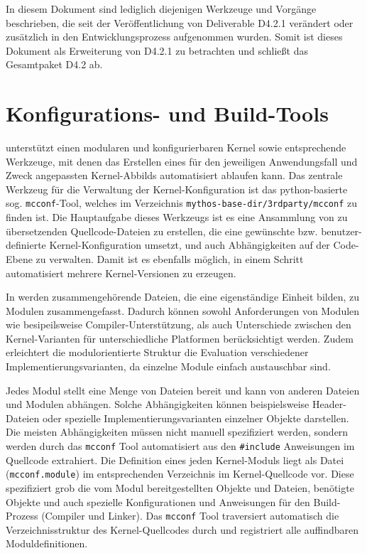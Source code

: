 In diesem Dokument sind lediglich diejenigen Werkzeuge und Vorgänge beschrieben,
die seit der Veröffentlichung von Deliverable D4.2.1 verändert oder zusätzlich in den
Entwicklungsprozess aufgenommen wurden. Somit ist dieses Dokument als
Erweiterung von D4.2.1 zu betrachten und schließt das Gesamtpaket D4.2 ab.

\section{Konfigurations- und Build-Tools}

\mythos unterstützt einen modularen und konfigurierbaren Kernel sowie
entsprechende Werkzeuge, mit denen das Erstellen eines für den jeweiligen
Anwendungsfall und Zweck angepassten Kernel-Abbilds automatisiert ablaufen kann.
Das zentrale Werkzeug für die Verwaltung der Kernel-Konfiguration ist das
python-basierte sog. \texttt{mcconf}-Tool, welches im Verzeichnis
\texttt{{mythos-base-dir}/3rdparty/mcconf} zu finden ist. Die Hauptaufgabe
dieses Werkzeugs ist es eine Ansammlung von zu übersetzenden Quellcode-Dateien
zu erstellen, die eine gewünschte bzw. benutzer-definierte Kernel-Konfiguration
umsetzt, und auch Abhängigkeiten auf der Code-Ebene zu verwalten. Damit ist
es ebenfalls möglich, in einem Schritt automatisiert mehrere Kernel-Versionen zu
erzeugen. 

In \mythos werden zusammengehörende Dateien, die eine eigenständige Einheit
bilden, zu Modulen zusammengefasst. Dadurch können sowohl Anforderungen von
Modulen wie besipeilsweise Compiler-Unterstützung, als auch Unterschiede
zwischen den Kernel-Varianten für unterschiedliche Platformen berücksichtigt
werden. Zudem erleichtert die modulorientierte Struktur die Evaluation
verschiedener Implementierungsvarianten, da einzelne Module einfach austauschbar
sind.

Jedes Modul stellt eine Menge von Dateien bereit und kann von anderen Dateien
und Modulen abhängen. Solche Abhängigkeiten können beispielsweise Header-Dateien
oder spezielle Implementierungsvarianten einzelner Objekte darstellen. Die
meisten Abhängigkeiten müssen nicht manuell spezifiziert werden, sondern werden
durch das \texttt{mcconf} Tool automatisiert aus den \texttt{\#include}
Anweisungen im Quellcode extrahiert. Die Definition eines jeden Kernel-Moduls
liegt als Datei (\texttt{mcconf.module}) im entsprechenden Verzeichnis im
Kernel-Quellcode vor. Diese spezifiziert grob die vom Modul bereitgestellten
Objekte und Dateien, benötigte Objekte und auch spezielle Konfigurationen und
Anweisungen für den Build-Prozess (Compiler und Linker). Das \texttt{mcconf}
Tool traversiert automatisch die Verzeichnisstruktur des Kernel-Quellcodes durch
und registriert alle auffindbaren Moduldefinitionen.

